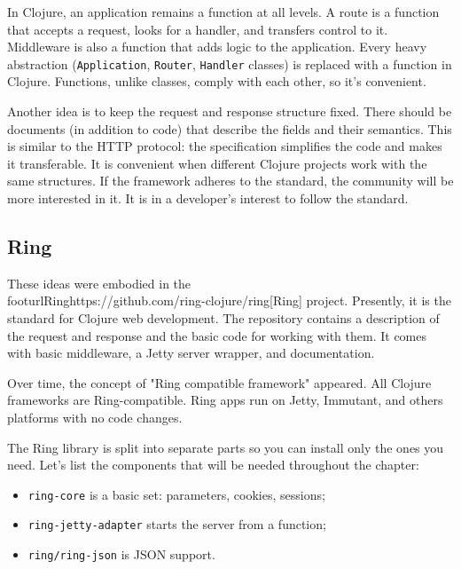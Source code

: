 \label{http-all-function}

In Clojure, an application remains a function at all levels. A route is a function that accepts a request, looks for a handler, and transfers control to it. Middleware
is also a function that adds logic to the application. Every heavy abstraction (\verb|Application|, \verb|Router|, \verb|Handler| classes) is replaced with a function in Clojure. Functions, unlike classes, comply with each other, so it's convenient.

Another idea is to keep the request and response structure fixed. There should be documents (in addition to code) that describe the fields and their semantics. This is similar to the HTTP protocol: the specification simplifies the code and makes it transferable. It is convenient when different Clojure projects work with the same structures. If the framework adheres to the standard, the community will be more interested in it. It is in a developer's interest to follow the standard.

\subsection{Ring}

\label{ring-jetty}

These ideas were embodied in the \\footurl{Ring}{https://github.com/ring-clojure/ring}[Ring] project.
Presently, it is the standard for Clojure web development. The repository contains a description of the request and response and the basic code for working with them. It comes with basic middleware, a Jetty server wrapper, and documentation.


Over time, the concept of "Ring compatible framework" appeared. All Clojure frameworks are Ring-compatible. Ring apps run on Jetty, Immutant, and others platforms with no code changes.

The Ring library is split into separate parts so you can install only the ones you need. Let's list the components that will be needed throughout the chapter:

\begin{itemize}

\item
\verb|ring-core| is a basic set: parameters, cookies, sessions;

\item
\verb|ring-jetty-adapter| starts the server from a function;

\item
\verb|ring/ring-json| is JSON support.

\end{itemize}


